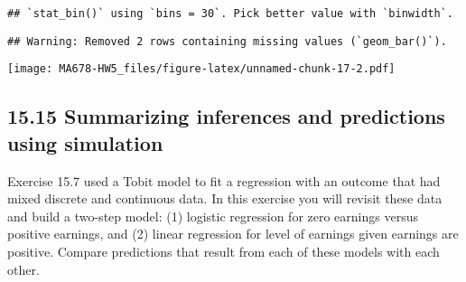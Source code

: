 \documentclass[
]{article}
\newenvironment{Shaded}{\begin{snugshade}}{\end{snugshade}}
\newcommand{\AttributeTok}[1]{\textcolor[rgb]{0.13,0.29,0.53}{#1}}
\newcommand{\DecValTok}[1]{\textcolor[rgb]{0.00,0.00,0.81}{#1}}
\newcommand{\FunctionTok}[1]{\textcolor[rgb]{0.13,0.29,0.53}{\textbf{#1}}}
\newcommand{\NormalTok}[1]{#1}
\newcommand{\SpecialCharTok}[1]{\textcolor[rgb]{0.81,0.36,0.00}{\textbf{#1}}}
\newcommand{\StringTok}[1]{\textcolor[rgb]{0.31,0.60,0.02}{#1}}
\begin{document}
\begin{Shaded}
\end{Shaded}

\begin{verbatim}
## `stat_bin()` using `bins = 30`. Pick better value with `binwidth`.
\end{verbatim}

\begin{verbatim}
## Warning: Removed 2 rows containing missing values (`geom_bar()`).
\end{verbatim}

\texttt{[image: MA678-HW5\_files/figure-latex/unnamed-chunk-17-2.pdf]}

\hypertarget{summarizing-inferences-and-predictions-using-simulation}{%
\subsection{15.15 Summarizing inferences and predictions using
simulation}\label{summarizing-inferences-and-predictions-using-simulation}}

Exercise 15.7 used a Tobit model to fit a regression with an outcome
that had mixed discrete and continuous data. In this exercise you will
revisit these data and build a two-step model: (1) logistic regression
for zero earnings versus positive earnings, and (2) linear regression
for level of earnings given earnings are positive. Compare predictions
that result from each of these models with each other.
\end{document}
